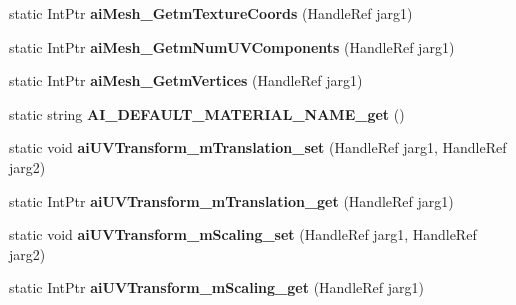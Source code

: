 \begin{DoxyCompactItemize}
\item 
\hypertarget{class_assimp_p_i_n_v_o_k_e_a986332a91b7e71d7651354c7472b92e2}{static Int\+Ptr {\bfseries ai\+Mesh\+\_\+\+Getm\+Texture\+Coords} (Handle\+Ref jarg1)}\label{class_assimp_p_i_n_v_o_k_e_a986332a91b7e71d7651354c7472b92e2}

\item 
\hypertarget{class_assimp_p_i_n_v_o_k_e_af58bdadac1945d54d52722b9316d2e40}{static Int\+Ptr {\bfseries ai\+Mesh\+\_\+\+Getm\+Num\+U\+V\+Components} (Handle\+Ref jarg1)}\label{class_assimp_p_i_n_v_o_k_e_af58bdadac1945d54d52722b9316d2e40}

\item 
\hypertarget{class_assimp_p_i_n_v_o_k_e_a70fd2060665d0f6f1eacfba7f8d55856}{static Int\+Ptr {\bfseries ai\+Mesh\+\_\+\+Getm\+Vertices} (Handle\+Ref jarg1)}\label{class_assimp_p_i_n_v_o_k_e_a70fd2060665d0f6f1eacfba7f8d55856}

\item 
\hypertarget{class_assimp_p_i_n_v_o_k_e_a0174c4fd40a2d61e8694b6d9d3aff638}{static string {\bfseries A\+I\+\_\+\+D\+E\+F\+A\+U\+L\+T\+\_\+\+M\+A\+T\+E\+R\+I\+A\+L\+\_\+\+N\+A\+M\+E\+\_\+get} ()}\label{class_assimp_p_i_n_v_o_k_e_a0174c4fd40a2d61e8694b6d9d3aff638}

\item 
\hypertarget{class_assimp_p_i_n_v_o_k_e_af86fdf18d2fb63fd7f1394f58057eadd}{static void {\bfseries ai\+U\+V\+Transform\+\_\+m\+Translation\+\_\+set} (Handle\+Ref jarg1, Handle\+Ref jarg2)}\label{class_assimp_p_i_n_v_o_k_e_af86fdf18d2fb63fd7f1394f58057eadd}

\item 
\hypertarget{class_assimp_p_i_n_v_o_k_e_a8dfdd6a9c385329021f9918ac4874568}{static Int\+Ptr {\bfseries ai\+U\+V\+Transform\+\_\+m\+Translation\+\_\+get} (Handle\+Ref jarg1)}\label{class_assimp_p_i_n_v_o_k_e_a8dfdd6a9c385329021f9918ac4874568}

\item 
\hypertarget{class_assimp_p_i_n_v_o_k_e_a583661508ef51a92994f16ac2239ca3a}{static void {\bfseries ai\+U\+V\+Transform\+\_\+m\+Scaling\+\_\+set} (Handle\+Ref jarg1, Handle\+Ref jarg2)}\label{class_assimp_p_i_n_v_o_k_e_a583661508ef51a92994f16ac2239ca3a}

\item 
\hypertarget{class_assimp_p_i_n_v_o_k_e_a76fe4eaaca9b4403aaaa1125886b35c0}{static Int\+Ptr {\bfseries ai\+U\+V\+Transform\+\_\+m\+Scaling\+\_\+get} (Handle\+Ref jarg1)}\label{class_assimp_p_i_n_v_o_k_e_a76fe4eaaca9b4403aaaa1125886b35c0}


\end{DoxyCompactItemize}
